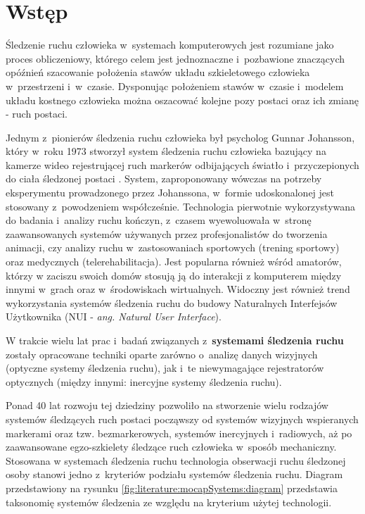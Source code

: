 
\chapter{Wstęp}\label{chap:intro}
Śledzenie ruchu człowieka w~systemach komputerowych jest rozumiane jako proces obliczeniowy, którego celem jest jednoznaczne i~pozbawione znaczących opóźnień szacowanie położenia stawów układu szkieletowego człowieka w~przestrzeni i~w~czasie. Dysponując położeniem stawów w~czasie i~modelem układu kostnego człowieka można oszacować kolejne pozy postaci oraz ich zmianę - ruch postaci.

Jednym z~pionierów śledzenia ruchu człowieka był psycholog Gunnar Johansson, który w~roku 1973 stworzył system śledzenia ruchu człowieka bazujący na kamerze wideo rejestrującej ruch markerów odbijających światło i~przyczepionych do ciała śledzonej postaci \cite{Johansson1973}. System, zaproponowany wówczas na potrzeby eksperymentu prowadzonego przez Johanssona, w~formie udoskonalonej jest stosowany z~powodzeniem współcześnie. Technologia pierwotnie wykorzystywana do badania i~analizy ruchu kończyn, z~czasem wyewoluowała w~stronę zaawansowanych systemów używanych przez profesjonalistów do tworzenia animacji, czy analizy ruchu w~zastosowaniach sportowych (trening sportowy) oraz medycznych (telerehabilitacja). Jest popularna również wśród amatorów, którzy w zaciszu swoich domów stosują ją do interakcji z komputerem między innymi w~grach oraz w~środowiskach wirtualnych. Widoczny jest również trend wykorzystania systemów śledzenia ruchu do budowy Naturalnych Interfejsów Użytkownika\cite{Glonek_Pietruszka_2012} (NUI - \emph{ang. Natural User Interface}).

W trakcie wielu lat prac i~badań związanych z~\textbf{systemami śledzenia ruchu} zostały opracowane techniki oparte zarówno o~analizę danych wizyjnych (optyczne systemy śledzenia ruchu), jak i~te niewymagające rejestratorów optycznych (między innymi: inercyjne systemy śledzenia ruchu).

Ponad 40 lat rozwoju tej dziedziny pozwoliło na stworzenie wielu rodzajów systemów śledzących ruch postaci począwszy od systemów wizyjnych wspieranych markerami oraz tzw. bezmarkerowych, systemów inercyjnych i~radiowych, aż po zaawansowane egzo-szkielety śledzące ruch człowieka w~sposób mechaniczny. Stosowana w systemach śledzenia ruchu technologia obserwacji ruchu śledzonej osoby stanowi jedno z~kryteriów podziału systemów śledzenia ruchu. Diagram przedstawiony na rysunku \ref{fig:literature:mocapSystems:diagram} przedstawia taksonomię systemów śledzenia ze względu na kryterium użytej technologii.

